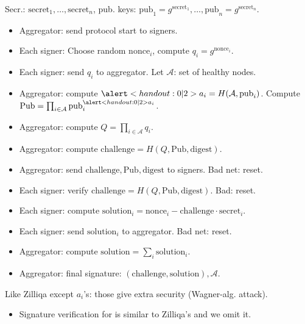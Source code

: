 \begin{frame}
Secr.: $\mathrm{secret}_1, \dots, \mathrm{secret}_n$, pub. keys: $\mathrm{pub}_1 = g^{ \mathrm{secret }_1 }, \dots, \mathrm{pub}_n= g^{\mathrm{secret}_n}$.
\begin{emptyTheorem}
\begin{itemize}
\item Aggregator: send protocol start to signers.
\item Each signer: Choose random $\mathrm{nonce}_i$, compute $q_i = g^{\mathrm{nonce}_i}$.
\item Each signer: send $q_i$ to aggregator. Let $\mathcal A$: set of healthy nodes.
\item Aggregator: compute $\alertNoH{2}{a_i= H(\mathcal A, \mathrm{pub}_i)}$. Compute $ \mathrm{Pub} =\prod_{i\in \mathcal A} \mathrm{pub}_i^{\alertNoH{2}{a_i}}$. 
\item Aggregator: compute $Q = \prod_{i \in \mathcal A} q_i$.
\item Aggregator: compute  $\mathrm{challenge} = H(Q, \mathrm{Pub}, \mathrm{digest})$.
\item Aggregator: send $\mathrm{challenge},\mathrm{Pub}, \mathrm{digest}$ to signers. Bad net: reset.
\item Each signer: verify $\mathrm{challenge} = H(Q, \mathrm {Pub}, \mathrm{digest}) $. Bad: reset.
\item Each signer: compute $\mathrm{solution}_i = {\mathrm{nonce}_i - \mathrm{challenge} \cdot \mathrm{secret}_i} $.
\item Each signer: send $\mathrm{solution}_i$ to aggregator. Bad net: reset.
\item Aggregator: compute $\mathrm{solution} = \sum_i \mathrm{solution}_i $.
\item Aggregator: final signature: $(\mathrm{challenge}, \mathrm{solution}), \mathcal A$.
\end{itemize}
\end{emptyTheorem}
\vskip -0.15cm
Like Zilliqa except $a_i$'s: those give extra security (Wagner-alg. attack).

\vskip 15cm

\end{frame}

\begin{frame}
\begin{itemize}
\item Signature verification for \cite{cryptoeprintSimpleSchnorrMultisignatures} is similar to Zilliqa's and we omit it.
\end{itemize}
\end{frame}

